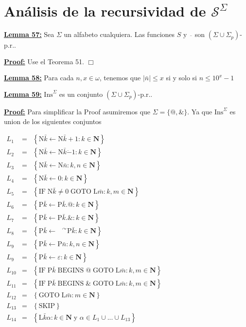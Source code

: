 \section{Análisis de la recursividad de $\mathcal{S}^{\Sigma}$}


\textbf{\underline{Lemma 57:}} Sea \(\Sigma \) un alfabeto cualquiera. Las funciones \(S\) y \(\overline{\ \;}\) son \((\Sigma \cup \Sigma _{p})\)-p.r..

\textbf{\underline{Proof:}} Use el Teorema 51. \(\Box\)

\textbf{\underline{Lemma 58:}} Para cada \(n,x\in \omega \), tenemos que \( \left\vert \bar{n}\right\vert \leq x\) si y solo si \(n\leq 10^{x}-1\)

\textbf{\underline{Lemma 59:}} \(\mathrm{Ins}^{\Sigma }\) es un conjunto \((\Sigma \cup \Sigma _{p})\)-p.r..

\textbf{\underline{Proof:}} Para simplificar la Proof asumiremos que \(\Sigma =\{@,\& \}\). Ya que \( \mathrm{Ins}^{\Sigma }\) es union de los siguientes conjuntos

\(\displaystyle \begin{array}{rcl} L_{1} & =& \left\{ \mathrm{N}\bar{k}\leftarrow \mathrm{N}\bar{k}+1:k\in \mathbf{N}\right\} \\ L_{2} & =& \left\{ \mathrm{N}\bar{k}\leftarrow \mathrm{N}\bar{k}\dot{-}1:k\in \mathbf{N}\right\} \\ L_{3} & =& \left\{ \mathrm{N}\bar{k}\leftarrow \mathrm{N}\bar{n}:k,n\in \mathbf{N}\right\} \\ L_{4} & =& \left\{ \mathrm{N}\bar{k}\leftarrow 0:k\in \mathbf{N}\right\} \\ L_{5} & =& \left\{ \mathrm{IF}\;\mathrm{N}\bar{k}\neq 0\;\mathrm{GOTO}\; \mathrm{L}\bar{m}:k,m\in \mathbf{N}\right\} \\ L_{6} & =& \left\{ \mathrm{P}\bar{k}\leftarrow \mathrm{P}\bar{k}.@:k\in \mathbf{N}\right\} \\ L_{7} & =& \left\{ \mathrm{P}\bar{k}\leftarrow \mathrm{P}\bar{k}.\& :k\in \mathbf{N}\right\} \\ L_{8} & =& \left\{ \mathrm{P}\bar{k}\leftarrow \text{ }^{\curvearrowright } \mathrm{P}\bar{k}:k\in \mathbf{N}\right\} \\ L_{9} & =& \left\{ \mathrm{P}\bar{k}\leftarrow \mathrm{P}\bar{n}:k,n\in \mathbf{N}\right\} \\ L_{9} & =& \left\{ \mathrm{P}\bar{k}\leftarrow \varepsilon :k\in \mathbf{N} \right\} \\ L_{10} & =& \left\{ \mathrm{IF}\;\mathrm{P}\bar{k}\;\mathrm{BEGINS}\;@\; \mathrm{GOTO}\;\mathrm{L}\bar{m}:k,m\in \mathbf{N}\right\} \\ L_{11} & =& \left\{ \mathrm{IF}\;\mathrm{P}\bar{k}\;\mathrm{BEGINS}\;\& \; \mathrm{GOTO}\;\mathrm{L}\bar{m}:k,m\in \mathbf{N}\right\} \\ L_{12} & =& \left\{ \mathrm{GOTO}\;\mathrm{L}\bar{m}:m\in \mathbf{N}\right\} \\ L_{13} & =& \left\{ \mathrm{SKIP}\right\} \\ L_{14} & =& \left\{ \mathrm{L}\bar{k}\alpha :k\in \mathbf{N\;}\text{y }\alpha \in L_{1}\cup ...\cup L_{13}\right\} \end{array} \)

